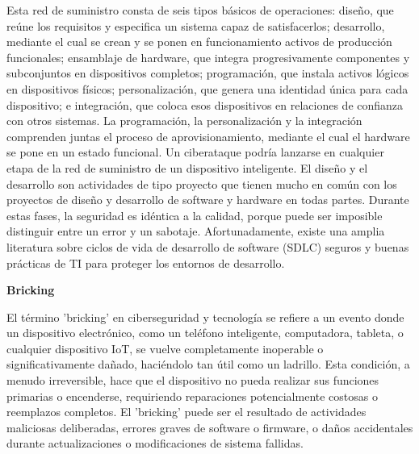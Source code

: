 Esta red de suministro consta de seis tipos básicos de operaciones: diseño, que reúne los requisitos y especifica un sistema capaz de satisfacerlos; desarrollo, mediante el cual se crean y se ponen en funcionamiento activos de producción funcionales; ensamblaje de hardware, que integra progresivamente componentes y subconjuntos en dispositivos completos; programación, que instala activos lógicos en dispositivos físicos; personalización, que genera una identidad única para cada dispositivo; e integración, que coloca esos dispositivos en relaciones de confianza con otros sistemas. La programación, la personalización y la integración comprenden juntas el proceso de aprovisionamiento, mediante el cual el hardware se pone en un estado funcional.
Un ciberataque podría lanzarse en cualquier etapa de la red de suministro de un dispositivo inteligente. El diseño y el desarrollo son actividades de tipo proyecto que tienen mucho en común con los proyectos de diseño y desarrollo de software y hardware en todas partes. Durante estas fases, la seguridad es idéntica a la calidad, porque puede ser imposible distinguir entre un error y un sabotaje. Afortunadamente, existe una amplia literatura sobre ciclos de vida de desarrollo de software (SDLC) seguros y buenas prácticas de TI para proteger los entornos de desarrollo.\cite{IoTSFSCIP2022}

\textbf{Bricking}

El término 'bricking' en ciberseguridad y tecnología se refiere a un evento donde un dispositivo electrónico, como un teléfono inteligente, computadora, tableta, o cualquier dispositivo IoT, se vuelve completamente inoperable o significativamente dañado, haciéndolo tan útil como un ladrillo. Esta condición, a menudo irreversible, hace que el dispositivo no pueda realizar sus funciones primarias o encenderse, requiriendo reparaciones potencialmente costosas o reemplazos completos. El 'bricking' puede ser el resultado de actividades maliciosas deliberadas, errores graves de software o firmware, o daños accidentales durante actualizaciones o modificaciones de sistema fallidas.

